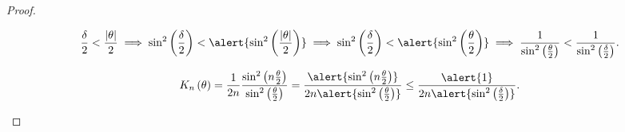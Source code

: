 \begin{frame}[allowframebreaks]
\begin{proof}
\begin{itemize}
			      \begin{equation*}
				      \frac{\delta}{2}<
				      \frac{\left|\theta\right|}{2}
				      \implies
				      \sin^{2}\left(\frac{\delta}{2}\right)<
				      \alert{
					      \sin^{2}\left(\frac{\left|\theta\right|}{2}\right)
				      }
				      \implies
				      \sin^{2}\left(\frac{\delta}{2}\right)
				      <
				      \alert{\sin^{2}\left(\frac{\theta}{2}\right)}
				      \implies
				      \frac{1}{\sin^{2}\left(\frac{\theta}{2}\right)}<
				      \frac{1}{\sin^{2}\left(\frac{\delta}{2}\right)}.
			      \end{equation*}

			      \begin{align*}
				      K_{n}\left(\theta\right)
				      =
				      \frac{1}{2n}
				      \frac{
					      \sin^{2}\left(n\frac{\theta}{2}\right)
				      }{
					      \sin^{2}\left(\frac{\theta}{2}\right)
				      }
				      =
				      \frac{
					      \alert{
						      \sin^{2}\left(n\frac{\theta}{2}\right)
					      }
				      }{
					      2n
					      \alert{
						      \sin^{2}\left(\frac{\theta}{2}\right)
					      }
				      }\leq
				      \frac{\alert{1}}{
					      2n
					      \alert{
						      \sin^{2}\left(\frac{\delta}{2}\right)
					      }
				      }.
			      \end{align*}
		\end{itemize}
	\end{proof}
\end{frame}

